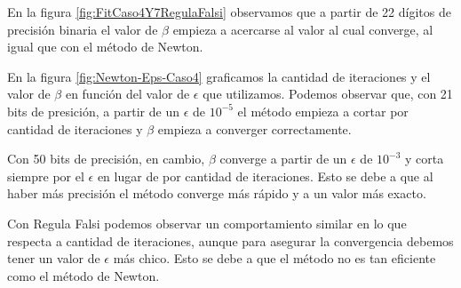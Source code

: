 En la figura \ref{fig:FitCaso4Y7RegulaFalsi} observamos que a partir de 22 d\'igitos de precisi\'on binaria el valor de $\beta$ empieza
a acercarse al valor al cual converge, al igual que con el m\'etodo de Newton.

En la figura \ref{fig:Newton-Eps-Caso4} graficamos la cantidad de iteraciones y el valor de $\beta$ en funci\'on del valor de $\epsilon$
que utilizamos. Podemos observar que, con 21 bits de presici\'on, a partir de un $\epsilon$ de $10^{-5}$ el m\'etodo
empieza a cortar por cantidad de iteraciones y $\beta$ empieza a converger correctamente.

Con 50 bits de precisi\'on, en cambio, $\beta$ converge a partir de un $\epsilon$ de $10^{-3}$ y corta siempre por 
el $\epsilon$ en lugar de por cantidad de iteraciones. Esto se debe a que al haber m\'as precisi\'on el m\'etodo converge m\'as
r\'apido y a un valor m\'as exacto.

Con Regula Falsi podemos observar un comportamiento similar en lo que respecta a cantidad de iteraciones, aunque para asegurar
la convergencia debemos tener un valor de $\epsilon$ m\'as chico. Esto se debe a que el m\'etodo no es tan eficiente como el
m\'etodo de Newton.
